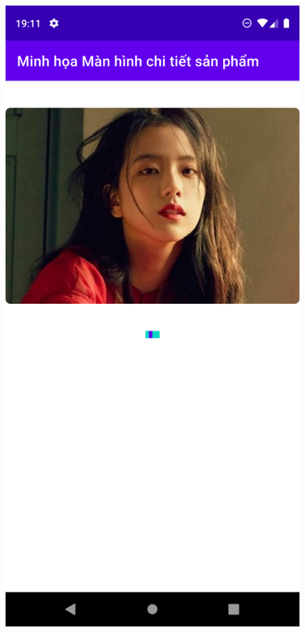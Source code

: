 \documentclass{beamer}
\begin{document}
\begin{frame}
    \begin{columns}
        \begin{figure}
            \centering
            \includegraphics[height=0.7\textheight]{images/32.png}

\end{figure}
\end{columns}
\end{frame}
\end{document}
